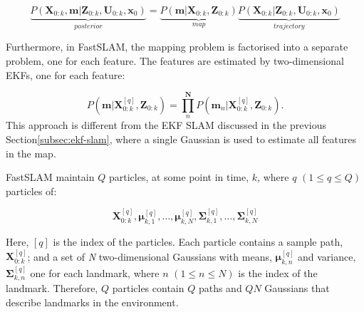 \begin{equation}
    \underbrace{P(\mathbf{X}_{0:k}, \mathbf{m}|\mathbf{Z}_{0:k}, \mathbf{U}_{0:k}, \mathbf{x}_0)}_{posterior} = \underbrace{P(\mathbf{m}|\mathbf{X}_{0:k},\mathbf{Z}_{0:k})}_{map}\underbrace{P(\mathbf{X}_{0:k}|\mathbf{Z}_{0:k}, \mathbf{U}_{0:k}, \mathbf{x}_0)}_{trajectory}
\end{equation}

Furthermore, in FastSLAM, the mapping problem is factorised into a separate problem, one for each feature. The features are estimated by two-dimensional EKFs, one for each feature:

\begin{equation}
    P(\mathbf{m}|\mathbf{X}_{0:k}^{[q]},\mathbf{Z}_{0:k}) = \prod_{n}^{\mathbf{N}} P(\mathbf{m}_n|\mathbf{X}_{0:k}^{[q]}, \mathbf{Z}_{0:k}).
\end{equation}
This approach is different from the EKF SLAM discussed in the previous Section\ref{subsec:ekf-slam}, where a single Gaussian is used to estimate all features in the map.

FastSLAM maintain $Q$ particles, at some point in time, $k$, where $q$ $(1 \leq q \leq Q)$ particles of:

\begin{equation}
\mathbf{X}_{0:k}^{[q]}, \mathbf{\mu}_{k,1}^{[q]}, \dots, \mathbf{\mu}_{k,N}^{[q]}, \mathbf{\Sigma}_{k,1}^{[q]},\dots, \mathbf{\Sigma}_{k,N}^{[q]}
\end{equation}

Here, $[q]$ is the index of the particles. Each particle contains a sample path, $\mathbf{X}_{0:k}^{[q]}$; and a set of \textit{N} two-dimensional Gaussians with means, $\mathbf{\mu}_{k,n}^{[q]}$ and variance, $\mathbf{\Sigma}_{k,n}^{[q]}$ one for each landmark, where $n$ $(1 \leq n \leq N)$ is the index of the landmark. Therefore, $Q$ particles contain $Q$ paths and $QN$ Gaussians that describe landmarks in the environment.

